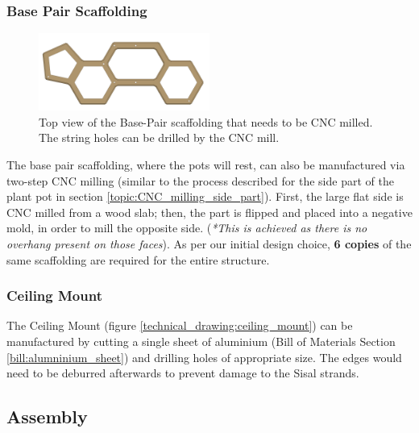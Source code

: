 \documentclass[12pt]{extarticle} %
\begin{document}
\subsubsection{Base Pair Scaffolding}
\begin{figure}[ht]
    \centering
    \includegraphics[width=0.5\textwidth]{images/screenshots/bp_transparent.png}
    \caption{Top view of the Base-Pair scaffolding that needs to be CNC milled. The string holes can be drilled by the CNC mill.}
    \label{topview:basepair}
\end{figure}

The base pair scaffolding, where the pots will rest, can also be manufactured via two-step CNC milling (similar to the process described for the side part of the plant pot in section \ref{topic:CNC_milling_side_part}). First, the large flat side is CNC milled from a wood slab; then, the part is flipped and placed into a negative mold, in order to mill the opposite side. (\textit{*This is achieved as there is no overhang present on those faces}). As per our initial design choice, \textbf{6 copies} of the same scaffolding are required for the entire structure.

\subsubsection{Ceiling Mount}
The Ceiling Mount (figure \ref{technical_drawing:ceiling_mount}) can be manufactured by cutting a single sheet of aluminium (Bill of Materials Section \ref{bill:alumninium_sheet}) and drilling holes of appropriate size. The edges would need to be deburred afterwards to prevent damage to the Sisal strands.

\pagebreak
\subsection{Assembly}
\end{document}
